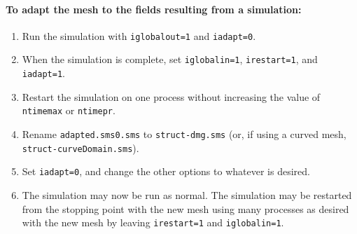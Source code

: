 \documentclass[letterpaper]{book}
\begin{document}
\paragraph{To adapt the mesh to the fields resulting from a simulation:}
\begin{enumerate}
\item Run the simulation with \texttt{iglobalout=1} and
  \texttt{iadapt=0}.
\item When the simulation is complete, set \texttt{iglobalin=1},
  \texttt{irestart=1}, and \texttt{iadapt=1}.
\item Restart the simulation on one process without increasing the
  value of \texttt{ntimemax} or \texttt{ntimepr}.
\item Rename \texttt{adapted.sms0.sms} to \texttt{struct-dmg.sms} (or,
  if using a curved mesh, \texttt{struct-curveDomain.sms}).
\item Set \texttt{iadapt=0}, and change the other
  options to whatever is desired.
\item The simulation may now be run as normal.  The simulation may be
  restarted from the stopping point with the new mesh using many
  processes as desired with the new mesh by leaving
  \texttt{irestart=1} and \texttt{iglobalin=1}.
\end{enumerate}
\end{document}

